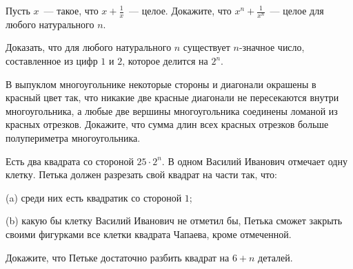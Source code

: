 \begin{problems}



\item
Пусть $x$~--- такое, что $x+ \frac{1}{x}$~--- целое. Докажите, что
$x^n + \frac{1}{x^n}$~--- целое для любого натурального $n$.




\item
Доказать, что для любого натурального $n$ существует $n$-значное число, составленное из цифр $1$ и $2$, которое делится на $2^n$.

\item
В выпуклом многоугольнике некоторые стороны и диагонали окрашены в
красный цвет так, что никакие две красные диагонали не пересекаются
внутри многоугольника, а любые две вершины многоугольника соединены
ломаной из красных отрезков. Докажите, что сумма длин всех красных
отрезков больше полупериметра многоугольника.

\item 
Есть два квадрата со стороной $25\cdot 2^n$. В одном Василий Иванович отмечает одну клетку. Петька должен разрезать свой квадрат на части так, что:

(a) среди них есть квадратик со стороной $1$;

(b) какую бы клетку Василий Иванович не отметил бы, Петька сможет закрыть своими фигурками все клетки квадрата Чапаева, кроме отмеченной. 

Докажите, что Петьке достаточно разбить квадрат на $6+n$ деталей.








\end{problems}

